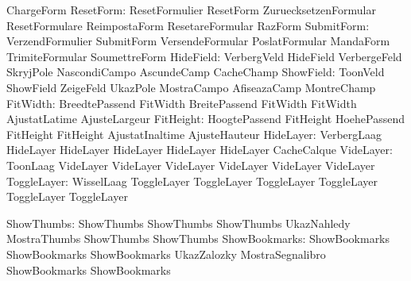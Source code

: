                            ChargeForm
                ResetForm: ResetFormulier            ResetForm
                           ZuruecksetzenFormular     ResetFormulare
                           ReimpostaForm             ResetareFormular
                           RazForm
               SubmitForm: VerzendFormulier          SubmitForm
                           VersendeFormular          PoslatFormular
                           MandaForm                 TrimiteFormular
                           SoumettreForm
                HideField: VerbergVeld               HideField
                           VerbergeFeld              SkryjPole
                           NascondiCampo             AscundeCamp
                           CacheChamp
                ShowField: ToonVeld                  ShowField
                           ZeigeFeld                 UkazPole
                           MostraCampo               AfiseazaCamp
                           MontreChamp
                 FitWidth: BreedtePassend            FitWidth
                           BreitePassend             FitWidth
                           FitWidth                  AjustatLatime
                           AjusteLargeur
                FitHeight: HoogtePassend             FitHeight
                           HoehePassend              FitHeight
                           FitHeight                 AjustatInaltime
                           AjusteHauteur
                HideLayer: VerbergLaag               HideLayer
                           HideLayer                 HideLayer
                           HideLayer                 HideLayer
                           CacheCalque
                VideLayer: ToonLaag                  VideLayer
                           VideLayer                 VideLayer
                           VideLayer                 VideLayer
                           VideLayer
              ToggleLayer: WisselLaag                ToggleLayer
                           ToggleLayer               ToggleLayer
                           ToggleLayer               ToggleLayer
                           ToggleLayer

               ShowThumbs: ShowThumbs                ShowThumbs
                           ShowThumbs                UkazNahledy
                           MostraThumbs              ShowThumbs
                           ShowThumbs
            ShowBookmarks: ShowBookmarks             ShowBookmarks
                           ShowBookmarks             UkazZalozky
                           MostraSegnalibro          ShowBookmarks
                           ShowBookmarks

